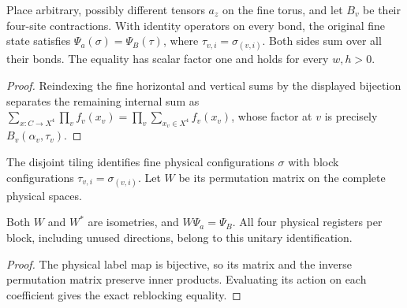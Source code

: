 \begin{lemma}%
    \label{thm:peps_two_by_two_geometric_blocking}
    \leanok
    Place arbitrary, possibly different tensors $a_z$ on the fine torus,
    and let $B_v$ be their four-site contractions. With identity
    operators on every bond, the original fine state satisfies
    $\Psi_a(\sigma)=\Psi_B(\tau)$, where
    $\tau_{v,i}=\sigma_{(v,i)}$. Both sides sum over all their bonds.
    The equality has scalar factor one and holds for every $w,h>0$.
\end{lemma}

\begin{proof}\leanok
    Reindexing the fine horizontal and vertical sums by the displayed
    bijection separates the remaining internal sum as
    $\sum_{x:C\to X^4}\prod_v f_v(x_v)=\prod_v\sum_{x_v\in X^4}f_v(x_v)$,
    whose factor at $v$ is precisely $B_v(\alpha_v,\tau_v)$.
\end{proof}

\begin{definition}%
    \label{def:peps_two_by_two_physical_grouping}
    \leanok
    The disjoint tiling identifies fine physical configurations $\sigma$
    with block configurations $\tau_{v,i}=\sigma_{(v,i)}$.
    Let $W$ be its permutation matrix on the complete physical spaces.
\end{definition}

\begin{lemma}%
    \label{thm:peps_two_by_two_physical_grouping}
    \leanok
    Both $W$ and $W^*$ are isometries, and $W\Psi_a=\Psi_B$.
    All four physical registers per block, including unused directions,
    belong to this unitary identification.
\end{lemma}

\begin{proof}\leanok
    The physical label map is bijective, so its matrix and the inverse
    permutation matrix preserve inner products. Evaluating its action on
    each coefficient gives the exact reblocking equality.
\end{proof}

